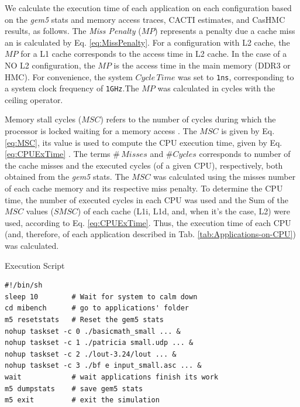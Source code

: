 \documentclass{sig-alternate-05-2015}
\begin{document}
We calculate the execution time of each application on each configuration based on the \emph{gem5} stats and memory access traces, CACTI estimates, and CasHMC results, as follows. The \emph{Miss Penalty} ($MP$) represents a penalty due a cache miss an is calculated by Eq. \ref{eq:MissPenalty}. For a configuration with L2 cache, the $MP$ for a L1 cache corresponds to the access time in L2 cache. In the case of a NO L2 configuration, the $MP$ is the access time in the main memory (DDR3 or HMC). For convenience, the system $Cycle\,Time$ was set to \texttt{{1ns}}, corresponding to a system clock frequency of \texttt{{1GHz}}.The $MP$ was calculated in cycles with the ceiling operator.

Memory stall cycles ($MSC$) refers to the number of cycles during which the processor is locked waiting for a memory access \cite{hennessypatterson:2012}. The $MSC$ is given by Eq. \ref{eq:MSC}, its value is used to compute the CPU execution time, given by Eq. \ref{eq:CPUExTime} \cite{hennessypatterson:2012}. The terms $\#\,Misses$ and $\#Cycles$ corresponds to number of the cache misses and the executed cycles (of a given CPU), respectively, both obtained from the {\emph{gem5}} stats. The $MSC$ was calculated using the misses number of each cache memory and its respective miss penalty. To determine the CPU time, the number of executed cycles in each CPU was used and the Sum of
the $MSC$ values ($SMSC$) of each cache (L1i, L1d, and, when it's the case, L2) were used, according to Eq. \ref{eq:CPUExTime}. Thus, the execution time of each CPU (and, therefore, of each application described in Tab. \ref{tab:Applications-on-CPU}) was calculated.

\begin{algorithm}
\caption{\label{alg:Execution-Script}Execution Script}


\begin{lstlisting}[basicstyle={\tiny}]
#!/bin/sh
sleep 10        # Wait for system to calm down
cd mibench      # go to applications' folder
m5 resetstats   # Reset the gem5 stats
nohup taskset -c 0 ./basicmath_small ... &
nohup taskset -c 1 ./patricia small.udp ... &
nohup taskset -c 2 ./lout-3.24/lout ... &
nohup taskset -c 3 ./bf e input_small.asc ... &
wait            # wait applications finish its work
m5 dumpstats    # save gem5 stats
m5 exit         # exit the simulation
\end{lstlisting}
\end{algorithm}
\end{document}
